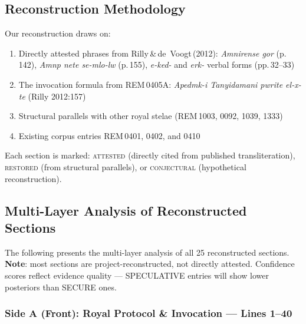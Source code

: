 \documentclass[11pt,a4paper]{article}
\begin{document}
\subsection{Reconstruction Methodology}

Our reconstruction draws on:
\begin{enumerate}[nosep]
  \item Directly attested phrases from Rilly\,\&\,de~Voogt\,(2012):
        \textit{Amnirense gor} (p.\,142),
        \textit{Amnp nete se-mlo-lw} (p.\,155),
        \textit{e-ked-} and \textit{erk-} verbal forms (pp.\,32--33)
  \item The invocation formula from REM\,0405A:
        \textit{Apedmk-i Tanyidamani pwrite el-x-te} (Rilly 2012:157)
  \item Structural parallels with other royal stelae (REM\,1003, 0092, 1039, 1333)
  \item Existing corpus entries REM\,0401, 0402, and 0410
\end{enumerate}

Each section is marked: \textcolor{attested}{\textsc{attested}} (directly
cited from published transliteration), \textcolor{restored}{\textsc{restored}}
(from structural parallels), or
\textcolor{conjectural}{\textsc{conjectural}} (hypothetical reconstruction).

\subsection{Multi-Layer Analysis of Reconstructed Sections}

The following presents the multi-layer analysis of all
25 reconstructed sections. \textbf{Note}: most sections are
project-reconstructed, not directly attested. Confidence scores
reflect evidence quality — SPECULATIVE entries will show lower posteriors
than SECURE ones.


\subsubsection*{Side A (Front): Royal Protocol \& Invocation --- Lines 1--40}
\end{document}
